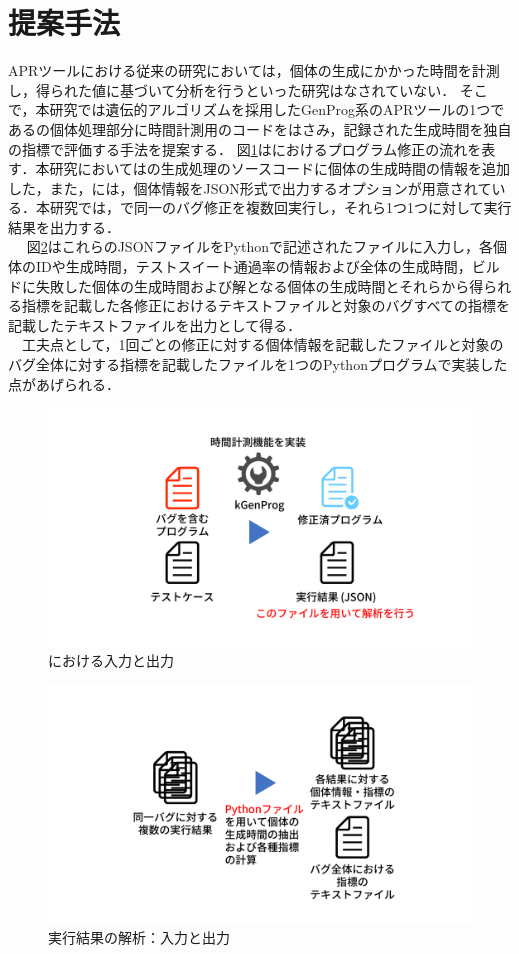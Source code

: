 \documentclass[uplatex,dvipdfmx,a4paper]{jsarticle}
\let\oldcite\cite
\renewcommand{\cite}[1]{\xspace\oldcite{#1}}
\begin{document}
\section{提案手法} \label{sec:sgst}
APRツールにおける従来の研究においては，個体の生成にかかった時間を計測し，得られた値に基づいて分析を行うといった研究はなされていない．
そこで，本研究では遺伝的アルゴリズムを採用したGenProg\cite{le2011genprog}系のAPRツールの1つである\kgp\cite{higo2018kgenprog}の個体処理部分に時間計測用のコードをはさみ，記録された生成時間を独自の指標で評価する手法を提案する．
図\ref{fig:sgst_apr}は\kgp におけるプログラム修正の流れを表す．本研究においては\kgp の生成処理のソースコードに個体の生成時間の情報を追加した，また，\kgp には，個体情報をJSON形式で出力するオプションが用意されている．本研究では，\kgp で同一のバグ修正を複数回実行し，それら1つ1つに対して実行結果を出力する．\\　
図\ref{fig:sgst_flow}はこれらのJSONファイルをPythonで記述されたファイルに入力し，各個体のIDや生成時間，テストスイート通過率の情報および全体の生成時間，ビルドに失敗した個体の生成時間および解となる個体の生成時間とそれらから得られる指標を記載した各修正におけるテキストファイルと対象のバグすべての指標を記載したテキストファイルを出力として得る．\\　工夫点として，1回ごとの修正に対する個体情報を記載したファイルと対象のバグ全体に対する指標を記載したファイルを1つのPythonプログラムで実装した点があげられる．
\begin{figure}[t]
  \centering
  \includegraphics[width=\linewidth]{fig/sgst_apr.pdf}
  \caption{\kgp における入力と出力}
  \label{fig:sgst_apr}
\end{figure}
\begin{figure}[t]
  \centering
  \includegraphics[width=\linewidth]{fig/sgst_flow.pdf}
  \caption{実行結果の解析：入力と出力}
  \label{fig:sgst_flow}
\end{figure}
\end{document}
